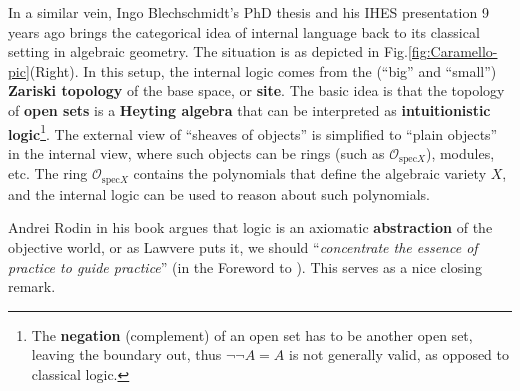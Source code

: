 \documentclass[runningheads]{llncs}
\begin{document}
In a similar vein, Ingo Blechschmidt's PhD thesis \cite{Blechschmidt2017} and his IHES presentation 9 years ago \cite{Blechschmidt-video2015} brings the categorical idea of internal language back to its classical setting in algebraic geometry.  The situation is as depicted in Fig.\ref{fig:Caramello-pic}(Right).  In this setup, the internal logic comes from the (``big'' and ``small'') \textbf{Zariski topology} of the base space, or \textbf{site}.  The basic idea is that the topology of \textbf{open sets} is a \textbf{Heyting algebra} that can be interpreted as \textbf{intuitionistic logic}\footnote{The \textbf{negation} (complement) of an open set has to be another open set, leaving the boundary out, thus $\neg \neg A = A$ is not generally valid, as opposed to classical logic.}.  The external view of ``sheaves of objects'' is simplified to ``plain objects'' in the internal view, where such objects can be rings (such as $\mathcal{O}_{\mathrm{spec} X}$), modules, etc.  The ring $\mathcal{O}_{\mathrm{spec} X}$ contains the polynomials that define the algebraic variety $X$, and the internal logic can be used to reason about such polynomials.

Andrei Rodin in his book \cite{Rodin2014} argues that logic is an axiomatic \textbf{abstraction} of the objective world, or as Lawvere \cite{Lawvere1997} \cite{Lawvere2003} puts it, we should ``\textit{concentrate the essence of practice to guide practice}'' (in the Foreword to \cite{Adamek2011}).  This serves as a nice closing remark.



%
%
%
% 
\printbibliography
\end{document}
